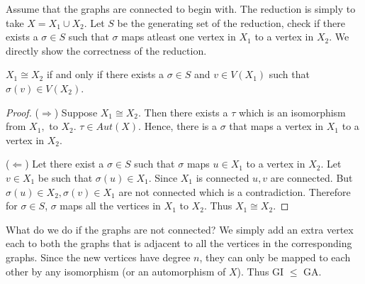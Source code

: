 Assume that the graphs are connected to begin with. The reduction is simply to take $X = X_1 \cup X_2$. Let $S$ be the generating set of the reduction, check if there exists a $\sigma \in S$ such that $\sigma$ maps atleast one vertex in $X_1$ to a vertex in $X_2$. We directly show the correctness of the reduction.

\begin{claim}
$X_1 \cong X_2$ if and only if there exists a $\sigma \in S$ and $v \in V(X_1)$ such that $\sigma(v) \in V(X_2)$.
\end{claim}
\begin{proof}
($\Rightarrow$) Suppose $X_1 \cong X_2$. Then there exists a $\tau$ which is an isomorphism from $X_1,$ to $X_2$. $\tau \in Aut(X)$. Hence, there is a $\sigma$ that maps a vertex in $X_1$ to a vertex in $X_2$.

($\Leftarrow$) Let there exist a $\sigma\in S$ such that $\sigma$ maps $u \in X_1$ to a vertex in $X_2$. Let $v \in X_1$ be such that $\sigma(u) \in X_1$. Since $X_1$ is connected $u,v$ are connected. But $\sigma(u) \in X_2, \sigma(v) \in X_1$ are not connected which is a contradiction. Therefore for $\sigma\in S$, $\sigma$ maps all the vertices in $X_1$ to $X_2$. Thus $X_1 \cong X_2$.
\end{proof}

What do we do if the graphs are not connected? We simply add an extra vertex each to both the graphs that is adjacent to all the vertices in the corresponding graphs. Since the new vertices have degree $n$, they can only be mapped to each other by any isomorphism (or an automorphism of $X$). Thus GI $\le$ GA.



